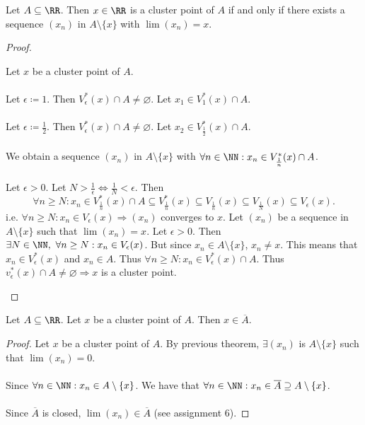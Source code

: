 \documentclass[class=scrartcl, crop=false]{standalone}
\begin{document}
\begin{theorem}
  Let $A \subseteq \RR$. Then $x \in \RR$ is a cluster point of $A$ if and only if there exists  a sequence $(x_n)$ in $A \setminus \{x\}$ with $\lim(x_n) = x$.
  \begin{proof}
    \begin{itemize}
      \ii[]
      \ii[$(\Rightarrow)$ ]
      Let $x$ be a cluster point of $A$.
      \\\\
      Let $\epsilon \coloneqq 1$. Then $V_\epsilon^*(x) \cap A \neq \varnothing$. Let $x_1 \in V_1^*(x) \cap A$.
      \\\\
      Let $\epsilon \coloneqq \frac{1}{2}$. Then $V_\epsilon^*(x) \cap A \neq \varnothing$. Let $x_2 \in V_{\frac{1}{2}}^*(x) \cap A$.
      \\\\
      We obtain a sequence $(x_n)$ in $A \setminus \{x\}$ with $\forall n\in \NN : x_n \in V_{\frac{1}{n}}^*(x) \cap A$.
      \\\\
      Let $\epsilon > 0$. Let $N > \frac{1}{\epsilon} \Leftrightarrow \frac{1}{N} < \epsilon$. Then
      \[
        \forall n \geq N : x_n \in V_{\frac{1}{n}}^*(x) \cap A \subseteq V_{\frac{1}{n}}^*(x) \subseteq V_{\frac{1}{n}}(x) \subseteq V_{\frac{1}{N}}(x) \subseteq V_\epsilon(x).
      \]
      i.e. $\forall n \geq N : x_n \in V_\epsilon(x) \Rightarrow (x_n)$ converges to $x$.
      \ii[$(\Leftarrow)$ ]
      Let $(x_n)$ be a sequence in $A \setminus \{x\}$ such that $\lim(x_n) = x$. Let $\epsilon > 0$. Then $\exists N \in \NN,\ \forall n \geq N : x_n \in V_\epsilon(x)$. But since $x_n \in A \setminus \{x\}$, $x_n \neq x$. This means that $x_n \in V_\epsilon^*(x)$ and $x_n \in A$. Thus $\forall n \geq N : x_n \in V_\epsilon^*(x) \cap A$. Thus $v_\epsilon^*(x) \cap A \neq \varnothing \Rightarrow x$ is a cluster point.
    \end{itemize} 
  \end{proof} 
\end{theorem} 
\begin{theorem}
  Let $A \subseteq \RR$. Let $x$ be a cluster point of $A$. Then $x \in \overline{A}$.
  \begin{proof}
    Let $x$ be a cluster point of $A$. By previous theorem, $\exists (x_n)$ is $A \setminus \{x\}$ such that $\lim(x_n) = 0$.
    \\\\
    Since $\forall n \in \NN : x_n \in A \setminus \{x\}$. We have that $\forall n \in \NN : x_n \in \overline{A} \supseteq A \setminus \{x\}$.
    \\\\
    Since $\overline{A}$ is closed, $\lim(x_n) \in \overline{A}$ (see assignment 6).
  \end{proof} 
\end{theorem} 
\end{document}
